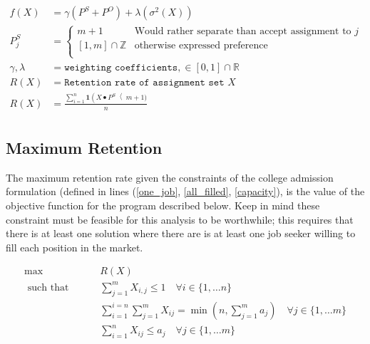 \begin{align}
f(X) &= \gamma(P^S + P^O) + \lambda (\sigma^2(X)) \\
P^S_j &= \begin{cases}
m + 1 &  \text{Would rather separate than accept assignment to } j \\
[1,m] \cap \mathbb{Z}  &  \text{otherwise expressed preference} \\
\end{cases} \\ 
\gamma, \lambda &= \texttt{weighting coefficients}, \in [0,1] \cap \mathbb{R} \\
R(X) &= \texttt{Retention rate of assignment set }X \\
R(X) &= \frac{\sum_{i=1}^n \mathbf{1}\left(X\bullet P^S\right < m+1)}{n} \label{retention_func}\\
\end{align}

\subsection{Maximum Retention}
\label{max_retention}

The maximum retention rate given the constraints of the college admission formulation (defined in lines (\ref{one_job}, \ref{all_filled}, \ref{capacity}), is the value of the objective function for the program described below. Keep in mind these constraint must be feasible for this analysis to be worthwhile; this requires that there is at least one solution where there are is at least one job seeker willing to fill each position in the market.

\begin{align}
\max \qquad & R(X) \\
\text{ such that } \qquad & \sum_{j=1}^m X_{i,j} \leq 1 \quad  \forall i \in \{1, \dots n\} \\
& \sum_{i = 1}^{i=n} \sum_{j = 1}^{m}X_{ij} = \min \left(n,\sum_{j = 1}^{m}a_j \right) \quad  \forall j \in \{1, \dots m\}  \\
& \sum_{i=1}^n X_{ij} \leq a_j \quad  \forall j \in \{1, \dots m\}  \\
\end{align} 
